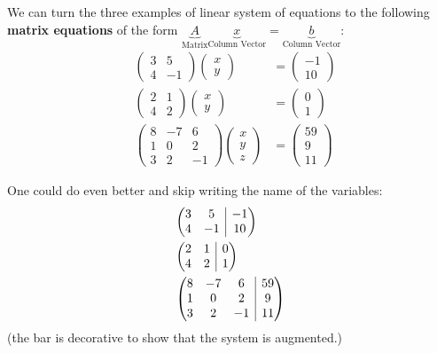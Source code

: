 \documentclass[12pt, a4paper]{article}
\makeatletter
\newenvironment{amatrix}[1]{%
  \left(\begin{array}{@{}*{#1}{c}|c@{}}
}{%
  \end{array}\right)
}
\theoremstyle{remark}
\theoremstyle{definition}
\numberwithin{equation}{section}
\numberwithin{definition}{section}
\numberwithin{example}{section}
\numberwithin{exercise}{section}
\numberwithin{remark}{section}
\numberwithin{figure}{section}
\makeatother
\begin{document}
We can turn the three examples of linear system of equations to the following \textbf{matrix equations} of the form $\underbrace{A}_{\text{Matrix}}\underbrace{x}_{\text{Column Vector}} = \underbrace{b}_{\text{Column Vector}}$:
\begin{align}
    &
    \begin{pmatrix}
        3 & 5 \\
        4 & -1
    \end{pmatrix}
    \begin{pmatrix}
        x \\ y
    \end{pmatrix}
    &=
    \begin{pmatrix}
        -1 \\ 10
    \end{pmatrix}
    \\
    &
    \begin{pmatrix}
        2 & 1 \\
        4 & 2
    \end{pmatrix}
    \begin{pmatrix}
        x \\ y
    \end{pmatrix}
    &= 
    \begin{pmatrix}
        0 \\ 1
    \end{pmatrix}
    \\
    &
    \begin{pmatrix}
        8 & -7 & 6 \\
        1 & 0 & 2 \\
        3 & 2 & -1
    \end{pmatrix}
    \begin{pmatrix}
        x \\ y \\ z
    \end{pmatrix}
    &=
    \begin{pmatrix}
        59 \\ 9 \\ 11
    \end{pmatrix}
\end{align}

One could do even better and skip writing the name of the variables:
\begin{align}
    &
    \begin{amatrix}{2}
        3 & 5 & -1 \\
        4 & -1 & 10
    \end{amatrix}
    \\
    &
    \begin{amatrix}{2}
        2 & 1 & 0 \\
        4 & 2 & 1
    \end{amatrix}
    \\
    &
    \begin{amatrix}{3}
        8 & -7 & 6 & 59 \\
        1 & 0 & 2 & 9 \\
        3 & 2 & -1 & 11
    \end{amatrix}
\end{align}
(the bar is decorative to show that the system is augmented.)
\end{document}
